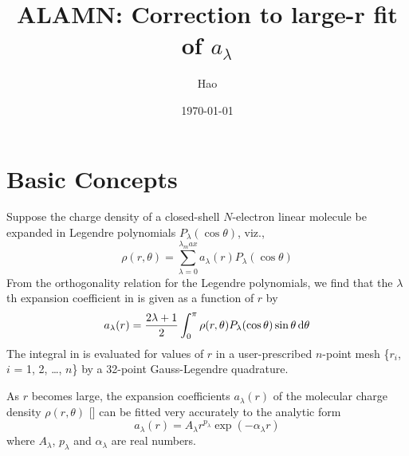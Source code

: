 \documentclass[aps,pra,groupedaddress,
                amsfonts,amssymb,
                preprint
    ]{revtex4}
\begin{document}
%
\date{\today}
%
\title[ALAMN: Correction to large-r fit of $a_\lambda$]
{ALAMN: Correction to large-r fit of $a_\lambda$}

\author{Hao }

\maketitle
\section{Basic Concepts}
Suppose the charge density of a closed-shell $N$-electron linear
molecule be expanded in Legendre polynomials $P_\lambda(\cos\theta)$,
viz.,
\begin{equation}
  \label{eq:ELP}
  \rho(r,\theta) = \sum_{\lambda=0}^{\lambda_max}a_\lambda(r)
                   P_\lambda(\cos\theta)
\end{equation}
From the orthogonality relation for the Legendre polynomials, we find
that the $\lambda$th expansion coefficient in  is given as a
function of $r$ by
\begin{equation}
  \label{eq:sal}
  a_\lambda(r) = \dfrac{2\lambda+1}{2}\int_0^\pi\rho(r,\theta)
                 P_\lambda(\cos\theta)\sin\theta\,\mathrm{d}\theta
\end{equation}
The integral in  is evaluated for values of $r$ in a
user-prescribed $n$-point mesh \{$r_i$, $i$ = 1, 2, \ldots, $n$\} by a
32-point Gauss-Legendre quadrature.

As $r$ becomes large, the expansion coefficients $a_\lambda(r)$ of the
molecular charge density $\rho(r,\theta)$ [] can be fitted very
accurately to the analytic form
\begin{equation}
  \label{eq:lal}
  a_\lambda(r) = A_\lambda r^{p_\lambda}\exp(-\alpha_\lambda r)
\end{equation}
where $A_\lambda$, $p_\lambda$ and $\alpha_\lambda$ are real numbers.
\end{document}
